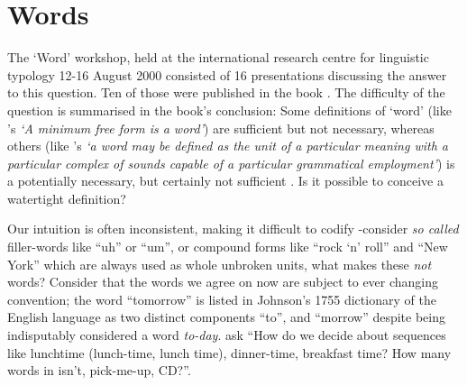 \chapter{Words}\label{chap:words}
\noindent
The `Word' workshop, held at the international research centre for linguistic typology 12-16 August 2000 consisted of 16 presentations discussing the answer to this question. Ten of those were published in the book . The difficulty of the question is summarised in the book's conclusion:
\noindent
Some definitions of `word' (like \citeauthor{bloomfield-1926-a-set-of}'s \parencite*{bloomfield-1926-a-set-of} \emph{`A minimum free form is a word'}) are sufficient but not necessary, whereas others (like \citeauthor{lyons-1968-introduction}'s \parencite*{lyons-1968-introduction} \emph{`a word may be defined as the unit of a particular meaning with a particular complex of sounds capable of a particular grammatical employment'}) is a potentially necessary, but certainly not sufficient \parencite{dixon02-word}. Is it possible to conceive a watertight definition?

Our intuition is often inconsistent, making it difficult to codify -consider \emph{so called} filler-words like ``uh'' or ``um'', or compound forms like ``rock `n' roll'' and ``New York'' which are always used as whole unbroken units, what makes these \emph{not} words? Consider that the words we agree on now are subject to ever changing convention; the word ``tomorrow'' is listed in Johnson's 1755 dictionary of the English language as two distinct components ``to'', and ``morrow'' despite being indisputably considered a word \emph{to-day}. \textcite{halliday-2004-lexicology} ask ``How do we decide about sequences like lunchtime (lunch-time, lunch time), dinner-time, breakfast time? How many words in isn't, pick-me-up, CD?''.

